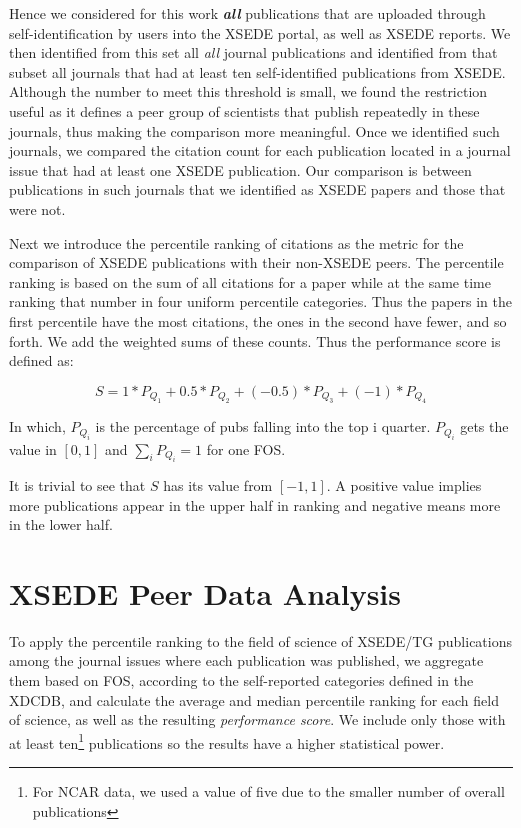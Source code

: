 \documentclass{sig-alternate}
\begin{document}
Hence we considered for this work {\em\bf all} publications that are uploaded through self-identification by users into the XSEDE portal, as well as XSEDE reports. We then identified from this set all {\em all} journal publications and identified from that subset all journals that had at least ten self-identified publications from XSEDE. Although the number to meet this threshold is small, we found the restriction useful as it defines a peer group of scientists that publish repeatedly in these journals, thus making the comparison more meaningful. Once we identified such journals, we compared the citation count for each publication located in a journal issue that had at least one XSEDE publication. Our comparison is between publications in such journals that we identified as XSEDE papers and those that were not. 

Next we introduce the percentile ranking of citations as the metric for the comparison of XSEDE publications with their non-XSEDE peers. The percentile ranking is based on the sum of all citations for a paper while at the same time ranking that number in four uniform percentile categories. Thus the papers in the first percentile have the most citations, the ones in the second have fewer, and so forth.  We add the weighted sums of these counts. Thus the performance score is defined as:

\[	S = 1*P_{Q_1} + 0.5*P_{Q_2}+ (-0.5)*P_{Q_3} + (-1)*P_{Q_4} \]

In which, $P_{Q_i}$ is the percentage of pubs falling into the top i quarter. $P_{Q_i}$ gets the value in $[0,1]$ and $\sum_{i} {P_{Q_i}} = 1$ for one FOS.

It is trivial to see that $S$ has its value from $[-1, 1]$. A positive value implies more publications appear in the upper half in ranking and negative means more in the lower half.

\section{XSEDE Peer Data Analysis}
\label{S:xsede}

To apply the percentile ranking to the field of science of XSEDE/TG publications among the journal issues where each publication was published, we aggregate them based on FOS, according to the self-reported categories defined in the XDCDB, and calculate the average and median percentile ranking for each field of science, as well as the resulting  \emph{performance score}. We include only those with at least ten\footnote{For NCAR data, we used a value of five due to the smaller number of overall publications} publications so the results have a higher statistical power. 
\end{document}
